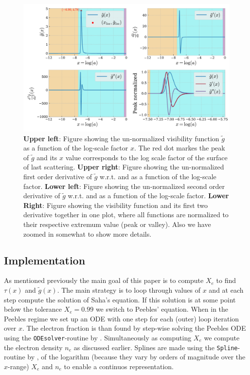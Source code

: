 \documentclass[twocolumn]{aastex62}
\begin{document}
\begin{figure}
    \includegraphics[scale = 0.65]{Figures/g_tilde.pdf}
    \caption{\textbf{Upper left}: Figure showing the un-normalized visibility function $\tilde{g}$ as a function of the log-scale factor $x$.
    The red dot markes the peak of $\tilde{g}$ 
    and its $x$ value corresponds to the log scale factor of the surface of last scattering. 
    \textbf{Upper right}: Figure showing the un-normalized first order derivative of $\tilde{g}$ w.r.t. and as a function of the log-scale factor. 
    \textbf{Lower left}: Figure showing the un-normalized second order derivative of $\tilde{g}$ w.r.t. and as a function of the log-scale factor.
    \textbf{Lower Right}: Figure showing the visibility function and its first two derivative together in one plot, where all functions are normalized to their respective extremum value (peak or valley). Also we have zoomed in somewhat to show more details.
    }
    \label{fig:g_tilde}
\end{figure}

\subsection{Implementation}\label{subsec:implementation}
As mentioned previously the main goal of this paper is to compute $X_e$ to find $\tau(x)$ and $\tilde{g}(x)$. The main strategy is to loop through values of $x$ and at each step compute the solution of Saha's equation. If this solution is at some point below the tolerance $X_e = 0.99$ we switch to Peebles' equation. When in the Peebles regime we set up an ODE with one step for each (outer) loop iteration over $x$. The electron fraction is than found by step-wise solving the Peebles ODE using the \texttt{ODEsolver}-routine by \cite{winther:2020}. Simultaneously as computing $X_e$ we compute the electron density $n_e$ as discussed earlier. Splines are made using the \texttt{Spline}-routine by \cite{winther:2020}, of the logarithm (because they vary by orders of magnitude over the $x$-range) $X_e$ and $n_e$ to enable a continuos representation.
\end{document}
